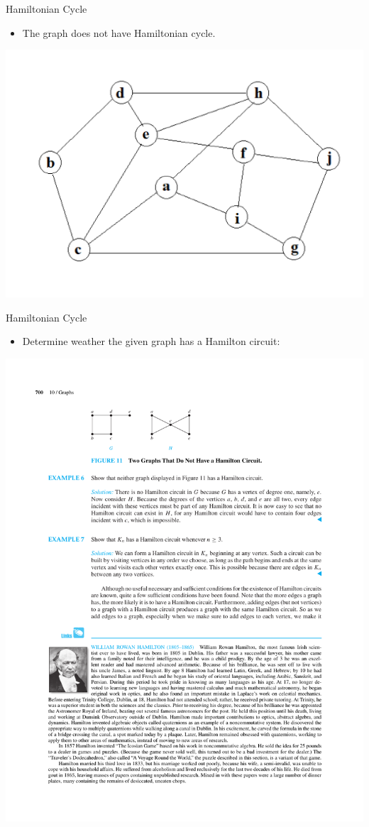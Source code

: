 \documentclass{beamer}
\theoremstyle{definition}
\begin{document}
\begin{frame}{Hamiltonian Cycle}
    \begin{itemize}
        \item The graph does not have Hamiltonian cycle.
    \end{itemize}
    \centering \includegraphics[width=.7\linewidth]{p1.jpg}
\end{frame}

\begin{frame}{Hamiltonian Cycle}
   \begin{itemize}
        \item Determine weather the given graph has a Hamilton circuit:
    \end{itemize}
    \centering \includegraphics[trim={5cm 23cm 10cm 2cm},clip,width=.8\linewidth]{p700}
\end{frame}
\end{document}

